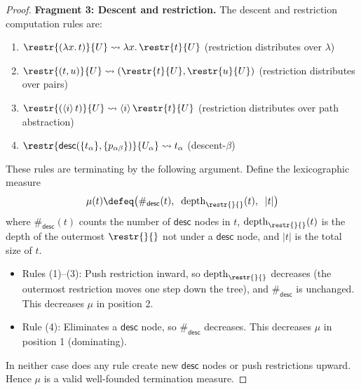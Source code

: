 \begin{proof}
\medskip
\noindent\textbf{Fragment 3: Descent and restriction.}
The descent and restriction computation rules are:
\begin{enumerate}
\item $\restr{(\lambda x.\, t)}{U} \rightsquigarrow
  \lambda x.\, \restr{t}{U}$ \hfill (restriction distributes over $\lambda$)
\item $\restr{(t, u)}{U} \rightsquigarrow
  (\restr{t}{U}, \restr{u}{U})$ \hfill (restriction distributes over pairs)
\item $\restr{(\langle i \rangle\, t)}{U} \rightsquigarrow
  \langle i \rangle\, \restr{t}{U}$ \hfill (restriction distributes over path abstraction)
\item $\restr{\mathsf{desc}(\{t_\alpha\}, \{p_{\alpha\beta}\})}{U_\alpha}
  \rightsquigarrow t_\alpha$ \hfill (descent-$\beta$)
\end{enumerate}

These rules are terminating by the following argument.
Define the lexicographic measure
\[
  \mu(t) \defeq
  \bigl(\#_{\mathsf{desc}}(t),\;\;
   \mathrm{depth}_{\restr{}{}}(t),\;\;
   |t|\bigr)
\]
where $\#_{\mathsf{desc}}(t)$ counts the number of $\mathsf{desc}$
nodes in $t$, $\mathrm{depth}_{\restr{}{}}(t)$ is the depth of the
outermost $\restr{}{}$ not under a $\mathsf{desc}$ node, and $|t|$
is the total size of $t$.

\begin{itemize}
\item Rules (1)--(3): Push restriction inward, so
  $\mathrm{depth}_{\restr{}{}}$ decreases (the outermost restriction
  moves one step down the tree), and $\#_{\mathsf{desc}}$ is unchanged.
  This decreases $\mu$ in position 2.
\item Rule (4): Eliminates a $\mathsf{desc}$ node, so $\#_{\mathsf{desc}}$
  decreases.  This decreases $\mu$ in position 1 (dominating).
\end{itemize}

In neither case does any rule create new $\mathsf{desc}$ nodes or push
restrictions upward.  Hence $\mu$ is a valid well-founded termination measure.


\end{proof}
